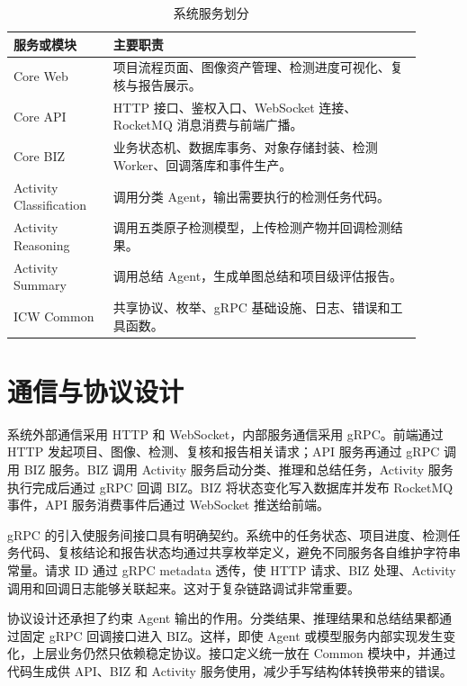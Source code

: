 \begin{table}[!htb]
  \caption{系统服务划分}\label{tab:service-division}
  \centering
  \begin{tabular}{@{}p{0.22\linewidth}p{0.68\linewidth}@{}} \toprule
    \textbf{服务或模块} & \textbf{主要职责} \\ \midrule
    Core Web & 项目流程页面、图像资产管理、检测进度可视化、复核与报告展示。 \\
    Core API & HTTP 接口、鉴权入口、WebSocket 连接、RocketMQ 消息消费与前端广播。 \\
    Core BIZ & 业务状态机、数据库事务、对象存储封装、检测 Worker、回调落库和事件生产。 \\
    Activity Classification & 调用分类 Agent，输出需要执行的检测任务代码。 \\
    Activity Reasoning & 调用五类原子检测模型，上传检测产物并回调检测结果。 \\
    Activity Summary & 调用总结 Agent，生成单图总结和项目级评估报告。 \\
    ICW Common & 共享协议、枚举、gRPC 基础设施、日志、错误和工具函数。 \\ \bottomrule
  \end{tabular}
\end{table}

\section{通信与协议设计}
\label{sec:impl-communication}

系统外部通信采用 HTTP 和 WebSocket，内部服务通信采用 gRPC。前端通过 HTTP 发起项目、图像、检测、复核和报告相关请求；API 服务再通过 gRPC 调用 BIZ 服务。BIZ 调用 Activity 服务启动分类、推理和总结任务，Activity 服务执行完成后通过 gRPC 回调 BIZ。BIZ 将状态变化写入数据库并发布 RocketMQ 事件，API 服务消费事件后通过 WebSocket 推送给前端。

gRPC 的引入使服务间接口具有明确契约。系统中的任务状态、项目进度、检测任务代码、复核结论和报告状态均通过共享枚举定义，避免不同服务各自维护字符串常量。请求 ID 通过 gRPC metadata 透传，使 HTTP 请求、BIZ 处理、Activity 调用和回调日志能够关联起来。这对于复杂链路调试非常重要。

协议设计还承担了约束 Agent 输出的作用。分类结果、推理结果和总结结果都通过固定 gRPC 回调接口进入 BIZ。这样，即使 Agent 或模型服务内部实现发生变化，上层业务仍然只依赖稳定协议。接口定义统一放在 Common 模块中，并通过代码生成供 API、BIZ 和 Activity 服务使用，减少手写结构体转换带来的错误。

